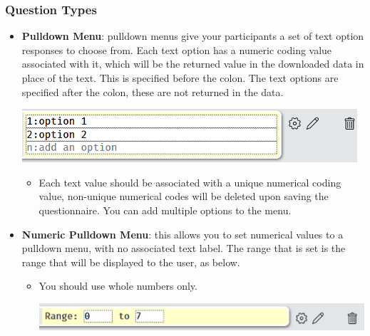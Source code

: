 \documentclass[]{book}
\providecommand{\tightlist}{%
  \setlength{\itemsep}{0pt}\setlength{\parskip}{0pt}}
\begin{document}
\subsubsection*{Question Types}\label{question-types}

\begin{itemize}
\tightlist
\item
  \textbf{Pulldown Menu}: pulldown menus give your participants a set of
  text option responses to choose from. Each text option has a numeric
  coding value associated with it, which will be the returned value in
  the downloaded data in place of the text. This is specified before the
  colon. The text options are specified after the colon, these are not
  returned in the data.

  \includegraphics{images/screenshots/quest_mixed_3.png}

  \begin{itemize}
  \tightlist
  \item
    Each text value should be associated with a unique numerical coding
    value, non-unique numerical codes will be deleted upon saving the
    questionnaire. You can add multiple options to the menu.
  \end{itemize}
\item
  \textbf{Numeric Pulldown Menu}: this allows you to set numerical
  values to a pulldown menu, with no associated text label. The range
  that is set is the range that will be displayed to the user, as below.

  \begin{itemize}
  \tightlist
  \item
    You should use whole numbers only.

    \includegraphics{images/screenshots/quest_mixed_4.png}


\end{itemize}
\end{itemize}
\end{document}
